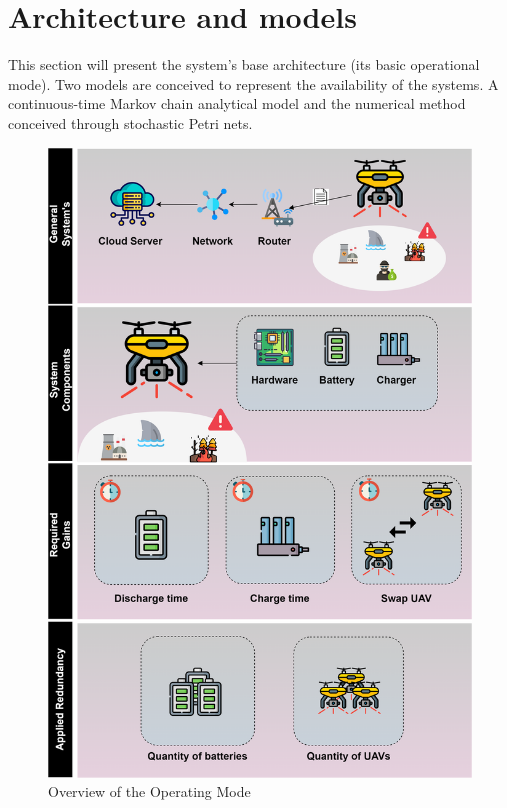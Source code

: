 \documentclass[conference]{IEEEtran}
\begin{document}
\section{Architecture and models}\label{sec:model}
This section will present the system's base architecture (its basic operational mode). Two models are conceived to represent the availability of the systems. A continuous-time Markov chain analytical model and the numerical method conceived through stochastic Petri nets.

\begin{figure}[htbp]
\centerline{\includegraphics[scale=0.45]{img/operating_model.png}}
\caption{Overview of the Operating Mode}
\label{fig:operating_mode_overview}
\end{figure}
\end{document}
